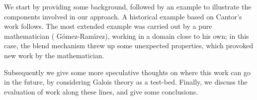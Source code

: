 We start by providing some background, followed by an example to
illustrate the components involved in our approach. A historical
example based on Cantor's work follows.  The most extended example was
carried out by a pure mathematician ( G{\'o}mez-Ram{\'{\i}}rez), working in a
domain close to his own; in this case, the blend mechanism threw up
some unexpected properties, which provoked new work by the
mathematician.

Subsequently we give some more speculative thoughts on where this work
can go in the future, by considering Galois theory as a test-bed.
Finally, we discuss the evaluation of work along these lines, and
give some conclusions.

